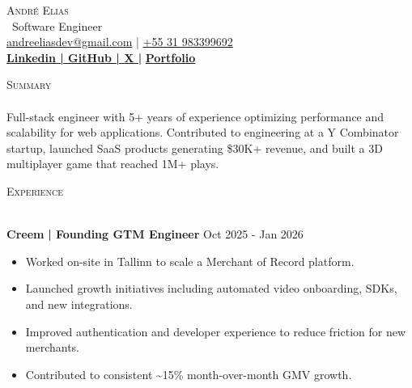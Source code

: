 \documentclass[a4paper]{article}
\newcommand{\lineunder}{
    \vspace*{-8pt} \\
    \hspace*{-18pt} \hrulefill \\
}
\newcommand{\header}[1]{
    {\hspace*{-18pt}\vspace*{6pt} \textsc{#1}}
    \vspace*{-6pt} \lineunder
}
\begin{document}
    \vspace*{-40pt}

    \vspace*{-2pt}
    \begin{center}
        {\Huge \scshape {André Elias}}\\
        \vspace*{2pt}
        \ {Software Engineer}\\
        \vspace*{2pt}
        \href{mailto:andreeliasdev@gmail.com}{andreeliasdev@gmail.com} | \href{tel:+55 31 983399692}{+55 31 983399692}\\
        \vspace*{4pt}
        \textbf{\href{https://www.linkedin.com/in/andr\%C3\%A9-elias/}{Linkedin | }}\textbf{\href{http://github.com/dedekpo}{GitHub | }}\textbf{\href{https://x.com/andreeliasdev}{X |}}
        \textbf{\href{https://www.andreelias.dev}{Portfolio}}\\
    \end{center}

    \header{Summary}
    \vspace{2mm}
    Full-stack engineer with 5+ years of experience optimizing performance and scalability for web applications. Contributed to engineering at a Y Combinator startup, launched SaaS products generating \$30K+ revenue, and built a 3D multiplayer game that reached 1M+ plays.
    \vspace{2mm}

    \header{Experience}
    \vspace{2mm}

       \textbf{Creem}\textbf{ | Founding GTM Engineer} \hfill  Oct 2025 - Jan 2026\\
    \vspace{-3mm}
   \begin{itemize} \itemsep -3pt
    \item Worked on-site in Tallinn to scale a Merchant of Record platform.
    \item Launched growth initiatives including automated video onboarding, SDKs, and new integrations.
    \item Improved authentication and developer experience to reduce friction for new merchants.
    \item Contributed to consistent \textasciitilde15\% month-over-month GMV growth.
\end{itemize}
\end{document}
